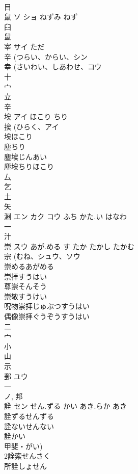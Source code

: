 \documentclass[8pt]{extreport}
\begin{document}
\begin{CJK}{UTF8}{min}
\\	目 
\\	鼠	ソ ショ	ねずみ ねず	
\\	臼 
\\	鼠 
\\	宰	サイ	ただ	
\\	辛 (つらい、からい、シン 
\\	幸 (さいわい、しあわせ、コウ 
\\	十 
\\	宀 
\\	立 
\\	辛 
\\	埃	アイ	ほこり ちり	
\\	挨 (ひらく、アイ 
\\	埃ほこり 
\\	塵ちり 
\\	塵埃じんあい 
\\	塵埃ちりほこり 
\\	厶 
\\	乞 
\\	土 
\\	矢 
\\	淵	エン カク コウ	ふち かた.い はなわ	
\\	一 
\\	汁 
\\	崇	スウ	あが.める す たか たかし たかむ	
\\	宗 (むね、シュウ、ソウ 
\\	崇めるあがめる 
\\	崇拝すうはい 
\\	尊崇そんそう 
\\	崇敬すうけい 
\\	呪物崇拝じゅぶつすうはい 
\\	偶像崇拝ぐうぞうすうはい 
\\	二 
\\	宀 
\\	小 
\\	山 
\\	示 
\\	郵	ユウ		
\\	一 
\\	ノ, 邦 
\\	詮	セン	せん.ずる かい あき.らか あき	
\\	詮ずるせんずる
\\	詮ないせんない
\\	詮かい
\\	甲斐・がい) 
\\	2詮索せんさく
\\	所詮しょせん

\end{CJK}
\end{document}
